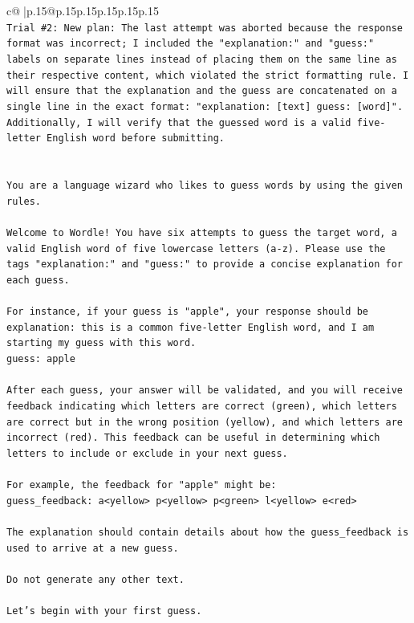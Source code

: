 \documentclass{article}
\begin{document}
{\begin{supertabular}{c@{$\;$}|p{.15\linewidth}@{}p{.15\linewidth}p{.15\linewidth}p{.15\linewidth}p{.15\linewidth}p{.15\linewidth}}
{{{\\ 
\texttt{Trial \#2: New plan: The last attempt was aborted because the response format was incorrect; I included the "explanation:" and "guess:" labels on separate lines instead of placing them on the same line as their respective content, which violated the strict formatting rule. I will ensure that the explanation and the guess are concatenated on a single line in the exact format: "explanation: {[}text{]} guess: {[}word{]}". Additionally, I will verify that the guessed word is a valid five{-}letter English word before submitting.} \\
\\ 
\\ 
\texttt{You are a language wizard who likes to guess words by using the given rules.} \\
\\ 
\texttt{Welcome to Wordle! You have six attempts to guess the target word, a valid English word of five lowercase letters (a{-}z). Please use the tags "explanation:" and "guess:" to provide a concise explanation for each guess.} \\
\\ 
\texttt{For instance, if your guess is "apple", your response should be} \\
\texttt{explanation: this is a common five{-}letter English word, and I am starting my guess with this word.} \\
\texttt{guess: apple} \\
\\ 
\texttt{After each guess, your answer will be validated, and you will receive feedback indicating which letters are correct (green), which letters are correct but in the wrong position (yellow), and which letters are incorrect (red). This feedback can be useful in determining which letters to include or exclude in your next guess.} \\
\\ 
\texttt{For example, the feedback for "apple" might be:} \\
\texttt{guess\_feedback: a<yellow> p<yellow> p<green> l<yellow> e<red>} \\
\\ 
\texttt{The explanation should contain details about how the guess\_feedback is used to arrive at a new guess.} \\
\\ 
\texttt{Do not generate any other text.} \\
\\ 
\texttt{Let's begin with your first guess.} \\
            }
        }
    }
     \\ \\


\end{supertabular}}
\end{document}
